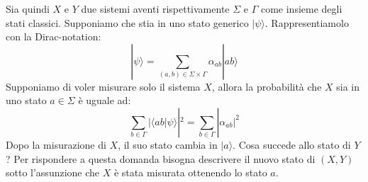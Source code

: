 Sia quindi $X$ e $Y$ due sistemi aventi rispettivamente $\Sigma$ e $\Gamma$ come insieme degli stati classici. Supponiamo che stia in uno stato generico $|\psi\rangle$. Rappresentiamolo con la Dirac-notation:
\begin{equation*}
    |\psi\rangle = \sum_{(a,b) \in \Sigma \times \Gamma} \alpha_{ab}|ab\rangle
\end{equation*}
Supponiamo di voler misurare solo il sistema $X$, allora la probabilità che $X$ sia in uno stato $a \in \Sigma$ è uguale ad:
\begin{equation*}
    \sum_{b \in \Gamma} |\langle ab|\psi\rangle|^2 = \sum_{b \in \Gamma} |\alpha_{ab}|^2
\end{equation*}
Dopo la misurazione di $X$, il suo stato cambia in $|a\rangle$. Cosa succede allo stato di $Y$? Per rispondere a questa domanda bisogna descrivere il nuovo stato di $(X,Y)$ sotto l'assunzione che $X$ è stata misurata ottenendo lo stato $a$.

